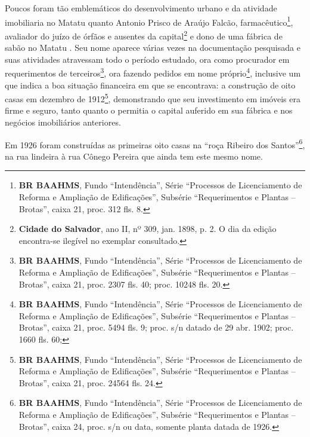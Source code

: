 
Poucos foram tão emblemáticos do desenvolvimento urbano e da atividade imobiliaria no Matatu quanto Antonio Prisco de Araújo Falcão, farmacêutico\footnote{\textbf{BR BAAHMS}, Fundo ``Intendência'', Série ``Processos de Licenciamento de Reforma e Ampliação de Edificações'', Subsérie ``Requerimentos e Plantas -- Brotas'', caixa 21, proc. 312 fls. 8.}, avaliador do juízo de órfãos e ausentes da capital\footnote{\textbf{Cidade do Salvador}, ano II, nº 309, jan. 1898, p. 2. O dia da edição encontra-se ilegível no exemplar consultado.} e dono de uma fábrica de sabão no Matatu \cite[p.~2732]{laemmert_almanak_1914}. Seu nome aparece várias vezes na documentação pesquisada e suas atividades atravessam todo o período estudado, ora como procurador em requerimentos de terceiros\footnote{\textbf{BR BAAHMS}, Fundo ``Intendência'', Série ``Processos de Licenciamento de Reforma e Ampliação de Edificações'', Subsérie ``Requerimentos e Plantas -- Brotas'', caixa 21, proc. 2307 fls. 40; proc. 10248 fls. 20.}, ora fazendo pedidos em nome próprio\footnote{\textbf{BR BAAHMS}, Fundo ``Intendência'', Série ``Processos de Licenciamento de Reforma e Ampliação de Edificações'', Subsérie ``Requerimentos e Plantas -- Brotas'', caixa 21, proc. 5494 fls. 9; proc. s/n datado de 29 abr. 1902; proc. 1660 fls. 60; }, inclusive um que indica a boa situação financeira em que se encontrava: a construção de oito casas em dezembro de 1912\footnote{\textbf{BR BAAHMS}, Fundo ``Intendência'', Série ``Processos de Licenciamento de Reforma e Ampliação de Edificações'', Subsérie ``Requerimentos e Plantas -- Brotas'', caixa 21, proc. 24564 fls. 24.}, demonstrando que seu investimento em imóveis era firme e seguro, tanto quanto o permitia o capital auferido em sua fábrica e nos negócios imobiliários anteriores.





Em 1926 foram construídas as primeiras oito casas na ``roça Ribeiro dos Santos''\footnote{\textbf{BR BAAHMS}, Fundo ``Intendência'', Série ``Processos de Licenciamento de Reforma e Ampliação de Edificações'', Subsérie ``Requerimentos e Plantas -- Brotas'', caixa 24, proc. s/n ou data, somente planta datada de 1926.}, na rua lindeira à rua Cônego Pereira que ainda tem este mesmo nome.


